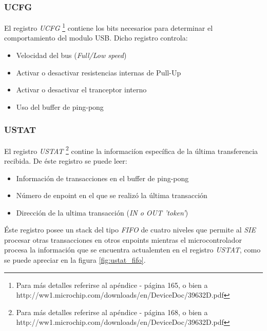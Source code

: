 \subsubsection{UCFG}
El registro \emph{UCFG} \footnote{Para m\'as detalles referirse al
ap\'endice - 
p\'agina 165, o bien a
http://ww1.microchip.com/downloads/en/DeviceDoc/39632D.pdf} contiene los bits
necesarios para determinar el comportamiento del modulo USB. Dicho registro
controla:

\begin{itemize}
 \item Velocidad del bus (\emph{Full/Low speed})

 \item Activar o desactivar resistencias internas de Pull-Up

 \item Activar o desactivar el tranceptor interno

 \item Uso del buffer de ping-pong
\end{itemize}

\subsubsection{USTAT}
El registro \emph{USTAT} \footnote{Para m\'as detalles referirse al
ap\'endice - 
p\'agina 168, o bien a
http://ww1.microchip.com/downloads/en/DeviceDoc/39632D.pdf} contine la
informaci\'ion espec\'ifica de la \'ultima transferencia recibida. De \'este
registro se puede leer:

\begin{itemize}
 \item Informaci\'on de transacciones en el buffer de ping-pong

 \item N\'umero de enpoint en el que se realiz\'o la \'ultima transacci\'on

 \item Direcci\'on de la ultima transacci\'on (\emph{IN o OUT 'token'})
\end{itemize}

\'Este registro posee un stack del tipo \emph{FIFO} de cuatro niveles que
permite al \emph{SIE} procesar otras transacciones en otros enpoints mientras
el microcontrolador procesa la informaci\'on que se encuentra actualemten en
el registro \emph{USTAT}, como se puede apreciar en la figura
\ref{fig:ustat_fifo}.

